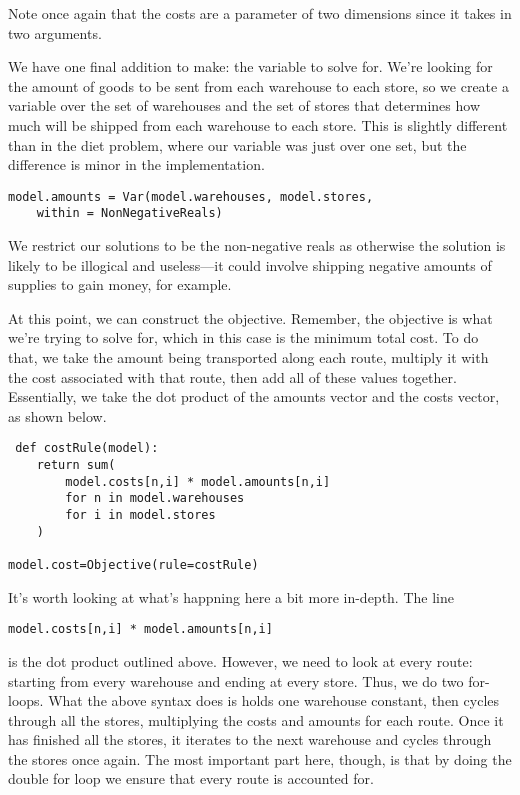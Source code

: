 \documentclass{article}
\begin{document}
\noindent
Note once again that the costs are a parameter of two dimensions since it takes in two arguments.  

We have one final addition to make: the variable to solve for.  We're looking for the amount of goods to be sent from each warehouse to each store, so we create a variable over the set of warehouses and the set of stores that determines how much will be shipped from each warehouse to each store.  This is slightly different than in the diet problem, where our variable was just over one set, but the difference is minor in the implementation.

\begin{verbatim}
model.amounts = Var(model.warehouses, model.stores, 
    within = NonNegativeReals)
\end{verbatim}

\noindent
We restrict our solutions to be the non-negative reals as otherwise the solution is likely to be illogical and useless---it could involve shipping negative amounts of supplies to gain money, for example.

At this point, we can construct the objective.  Remember, the objective is what we're trying to solve for, which in this case is the minimum total cost.  To do that, we take the amount being transported along each route, multiply it with the cost associated with that route, then add all of these values together.  Essentially, we take the dot product of the amounts vector and the costs vector, as shown below.

\begin{verbatim}
 def costRule(model):
    return sum(
        model.costs[n,i] * model.amounts[n,i]
        for n in model.warehouses
        for i in model.stores
    )

model.cost=Objective(rule=costRule)
\end{verbatim}

\noindent
It's worth looking at what's happning here a bit more in-depth.  The line \begin{verbatim}model.costs[n,i] * model.amounts[n,i] \end{verbatim} is the dot product outlined above.  However, we need to look at every route: starting from every warehouse and ending at every store.  Thus, we do two for-loops.  What the above syntax does is holds one warehouse constant, then cycles through all the stores, multiplying the costs and amounts for each route.  Once it has finished all the stores, it iterates to the next warehouse and cycles through the stores once again.  The most important part here, though, is that by doing the double for loop we ensure that every route is accounted for.
\end{document}
